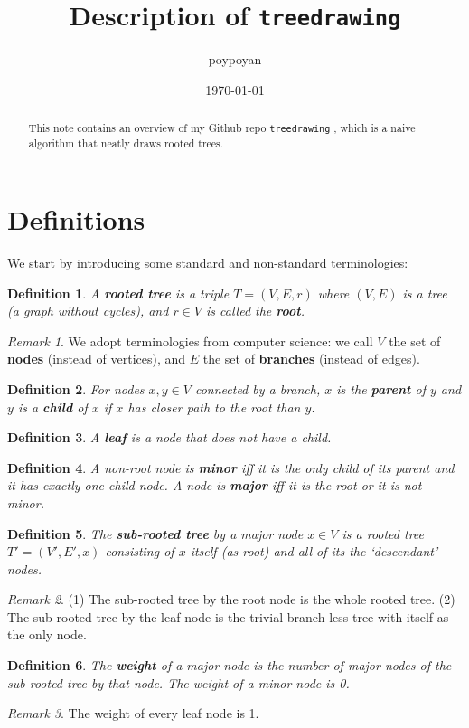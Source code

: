 \documentclass{article}
\title{Description of \texttt{treedrawing}}
\author{poypoyan}
\date{\petsa\today}
\theoremstyle{plain}
\newtheorem{definition}{Definition}[section]
\theoremstyle{remark}
\newtheorem*{remark}{Remark}
\begin{document}
\maketitle

\begin{abstract}
This note contains an overview of my Github repo \texttt{treedrawing} \cite{treedrawing}, which is a naive algorithm that neatly draws rooted trees.
\end{abstract}

\section{Definitions}
We start by introducing some standard and non-standard terminologies:
\begin{definition}
A \textbf{rooted tree} is a triple $T=(V, E, r)$ where $(V, E)$ is a tree (a graph without cycles), and $r \in V$ is called the \textbf{root}.
\end{definition}
\begin{remark}
We adopt terminologies from computer science: we call $V$ the set of \textbf{nodes} (instead of vertices), and $E$ the set of \textbf{branches} (instead of edges).
\end{remark}
\begin{definition}
For nodes $x, y \in V$ connected by a branch, $x$ is the \textbf{parent} of $y$ and $y$ is a \textbf{child} of $x$ if $x$ has closer path to the root than $y$. 
\end{definition}
\begin{definition}
A \textbf{leaf} is a node that does not have a child.
\end{definition}
\begin{definition}
A non-root node is \textbf{minor} iff it is the only child of its parent and it has exactly one child node. A node is \textbf{major} iff it is the root or it is not minor. 
\end{definition}
\begin{definition}
The \textbf{sub-rooted tree} by a major node $x \in V$ is a rooted tree $T'=(V', E', x)$ consisting of $x$ itself (as root) and all of its the `descendant' nodes.
\end{definition}
\begin{remark}
(1) The sub-rooted tree by the root node is the whole rooted tree. (2) The sub-rooted tree by the leaf node is the trivial branch-less tree with itself as the only node.
\end{remark}
\begin{definition}\label{weight}
The \textbf{weight} of a major node is the number of major nodes of the sub-rooted tree by that node. The weight of a minor node is 0.
\end{definition}
\begin{remark}
The weight of every leaf node is 1.
\end{remark}
\end{document}
